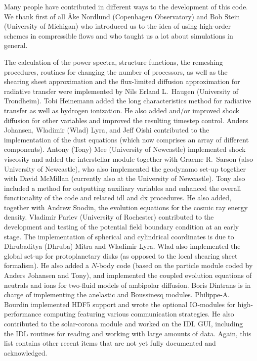 \documentclass[\mydriver,12pt,twoside,notitlepage,a4paper]{article}
\begin{document}
Many people have contributed in different ways to the development of this
code. We thank first of all {\AA}ke Nordlund (Copenhagen Observatory)
and Bob Stein (University of Michigan) who introduced us to the idea of
using high-order schemes in compressible flows and who taught us a lot
about simulations in general.

The calculation of the power spectra, structure functions,
the remeshing procedures,
routines for changing the number of processors, as well as
the shearing sheet approximation and the flux-limited diffusion
approximation for radiative transfer
were implemented by Nils Erland L.\ Haugen (University of Trondheim).
Tobi Heinemann added the long characteristics method for
radiative transfer as well as hydrogen ionization.
He also added and/or improved shock diffusion for other variables
and improved the resulting timestep control.
Anders Johansen, Wladimir (Wlad) Lyra, and Jeff Oishi contributed
to the implementation of
the dust equations (which now comprises an array of different components).
Antony (Tony) Mee (University of Newcastle) implemented shock viscosity
and added the interstellar module together with
Graeme R.\ Sarson (also University of Newcastle), who also implemented
the geodynamo set-up together with David McMillan
(currently also at the University of Newcastle).
Tony also included a method for outputting auxiliary variables and
enhanced the overall functionality of the code and related idl and dx
procedures.
He also added, together with Andrew Snodin, the evolution equations
for the cosmic ray energy density.
Vladimir Pariev (University of Rochester) contributed to the development
and testing of the potential field boundary condition at an early stage.
The implementation of spherical and cylindrical coordinates is due
to Dhrubaditya (Dhruba) Mitra and Wladimir Lyra. Wlad also
implemented the global set-up for protoplanetary
disks (as opposed to the local shearing sheet formalism). He also added a
$N$-body code (based on the particle module coded by Anders Johansen
and Tony), and implemented the coupled evolution equations of neutrals and
ions for two-fluid models of ambipolar diffusion.
Boris Dintrans is in charge of implementing the anelastic and Boussinesq modules.
Philippe-A. Bourdin implemented HDF5 support and wrote the optional IO-modules
for high-performance computing featuring various communication strategies.
He also contributed to the solar-corona module and worked on the IDL GUI,
including the IDL routines for reading and working with large amounts of data.
Again, this list contains other recent items that are not yet fully
documented and acknowledged.
\end{document}
